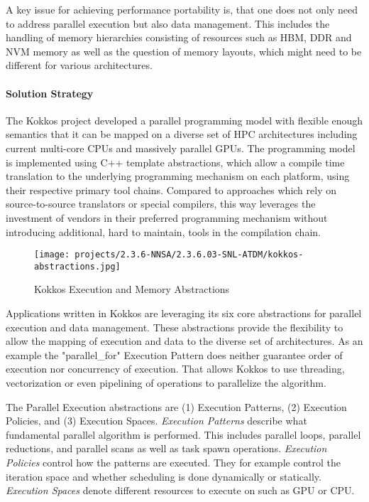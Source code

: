 A key issue for achieving performance portability is, that one does not only need to address parallel execution but also data management. 
This includes the handling of memory hierarchies consisting of resources such as HBM, DDR and NVM memory as well as the question of memory layouts, which might need to be different for various architectures. 

\paragraph{Solution Strategy}

The Kokkos project developed a parallel programming model with flexible enough semantics that it can be mapped on a diverse set of HPC architectures including current multi-core CPUs and massively parallel GPUs. 
The programming model is implemented using C++ template abstractions, which allow a compile time translation to the underlying programming mechanism on each platform, using their respective primary tool chains. 
Compared to approaches which rely on source-to-source translators or special compilers, this way leverages the investment of vendors in their preferred programming mechanism without introducing additional, hard to maintain, tools in the compilation chain. 

\begin{figure}[ht!]
\centering
\texttt{[image: projects/2.3.6-NNSA/2.3.6.03-SNL-ATDM/kokkos-abstractions.jpg]}
\caption{Kokkos Execution and Memory Abstractions}
\end{figure}

Applications written in Kokkos are leveraging its six core abstractions for parallel execution and data management. 
These abstractions provide the flexibility to allow the mapping of execution and data to the diverse set of architectures. 
As an example the "parallel\_for" Execution Pattern does neither guarantee order of execution nor concurrency of execution. 
That allows Kokkos to use threading, vectorization or even pipelining of operations to parallelize the algorithm. 

The Parallel Execution abstractions are (1) Execution Patterns, (2) Execution Policies, and (3) Execution Spaces. 
{\it Execution Patterns} describe what fundamental parallel algorithm is performed. This includes parallel loops, parallel reductions, and parallel scans as well as task spawn operations. 
{\it Execution Policies} control how the patterns are executed. They for example control the iteration space and whether scheduling is done dynamically or statically.
{\it Execution Spaces} denote different resources to execute on such as GPU or CPU. 

